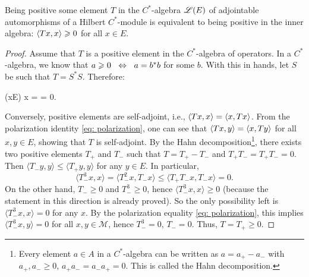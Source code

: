 \begin{proposicao}
    Being positive some element $T$ in the $C^*$-algebra $\mathscr L(E)$ of adjointable automorphisms of a Hilbert $C^*$-module is equivalent to being positive in the inner algebra: $\langle {Tx},{x}\rangle \geqslant 0$ for all $x\in E$.
    \begin{proof}
    Assume that $T$ is a positive element in the $C^*$-algebra of operators. In a $C^*$-algebra, we know that $a \geqslant 0 \operatorname{\hspace{0.25cm}\Leftrightarrow\hspace{0.25cm}} a=b^*b$ for some $b$. With this in hands, let $S$ be such that $T = S^*S$. Therefore:
    \begin{eqspaced}{(x\in E)}
    x =  =  \bilateral{-0.25cm}{\overset{\ref{def: pre-hilb module}\ref{def item: positivo definido}}\geq} 0.
    \end{eqspaced}
    Conversely, positive elements are self-adjoint, i.e., $\langle {Tx},{x}\rangle = \langle {x},{Tx}\rangle$. From the polarization identity \ref{eq: polarization}, one can see that $\langle {Tx},{y}\rangle = \langle {x},{Ty}\rangle$ for all $x,y \in E$, showing that $T$ is self-adjoint. By the Hahn decomposition\footnote{Every element $a\in A$ in a $C^*$-algebra can be written as $a = a_+-a_-$ with $a_+, a_-\geqslant 0$, $a_+a_-=a_-a_+=0$. This is called the Hahn decomposition.}, there exists two positive elements $T_+$ and $T_-$ such that $T = T_+-T_-$ and $T_+T_-= T_+T_- = 0$. Then $\langle T_{-} y, y\rangle \leq\langle T_{+} y, y\rangle$ for any $y \in E$. In particular,
    $$
    \langle T_{-}^{3} x, x\rangle=\langle T_{-}^{2} x, T_{-} x\rangle \leq\langle T_{+} T_{-} x, T_{-} x\rangle=0 .
    $$
    On the other hand, $T_{-} \geq 0$ and $T_{-}^{3} \geq 0$, hence $\langle T_{-}^{3} x, x\rangle \geq 0$ (because the statement in this direction is already proved). So the only possibility left is $\langle T_{-}^{3} x, x\rangle=0$ for any $x $. By the polarization equality \ref{eq: polarization}, this implies $\langle T_{-}^{3} x, y\rangle=0$ for all $x, y \in \mathcal{M}$, hence $T_{-}^{3}=0$, $T_{-}=0$. Thus, $T=T_{+} \geq 0$.
    \end{proof}
\end{proposicao}
    
